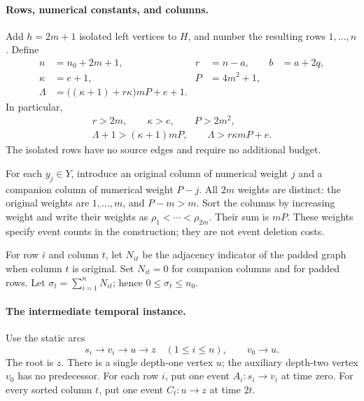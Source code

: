 \paragraph{Rows, numerical constants, and columns.}
Add \(h=2m+1\) isolated left vertices to \(H\), and number the resulting
rows \(1,\ldots,n\). Define
\begin{equation}
\label{hard:constants}
\begin{aligned}
 n&=n_0+2m+1, & r&=n-a, & b&=a+2q,\\
 \kappa&=e+1, & P&=4m^2+1,\\
 \Lambda&=\bigl((\kappa+1)+r\kappa\bigr)mP+e+1 .
\end{aligned}
\end{equation}
In particular,
\begin{equation}
\label{hard:gaps}
\begin{gathered}
 r>2m,\qquad \kappa>e,\qquad P>2m^2,\\
 \Lambda+1>(\kappa+1)mP,\qquad
 \Lambda>r\kappa mP+e.
\end{gathered}
\end{equation}
The isolated rows have no source edges and require no additional budget.

For each \(y_j\in Y\), introduce an original column of numerical weight
\(j\) and a companion column of numerical weight \(P-j\).
All \(2m\) weights are distinct: the original weights are \(1,\ldots,m\),
and \(P-m>m\). Sort the columns by increasing weight and write their weights
as \(\rho_1<\cdots<\rho_{2m}\). Their sum is \(mP\).
These weights specify event counts in the construction; they are not event
deletion costs.

For row \(i\) and column \(t\), let \(N_{it}\) be the adjacency indicator
of the padded graph when column \(t\) is original. Set \(N_{it}=0\) for
companion columns and for padded rows. Let
\(\sigma_t=\sum_{i=1}^n N_{it}\); hence \(0\le\sigma_t\le n_0\).

\paragraph{The intermediate temporal instance.}
Use the static arcs
\[
 s_i\longrightarrow v_i\longrightarrow u\longrightarrow z
 \quad (1\le i\le n),\qquad v_0\longrightarrow u.
\]
The root is \(z\). There is a single depth-one vertex \(u\); the auxiliary
depth-two vertex \(v_0\) has no predecessor. For each row \(i\), put one
event \(A_i:s_i\to v_i\) at time zero. For every sorted column \(t\), put one
event \(C_t:u\to z\) at time \(2t\).

